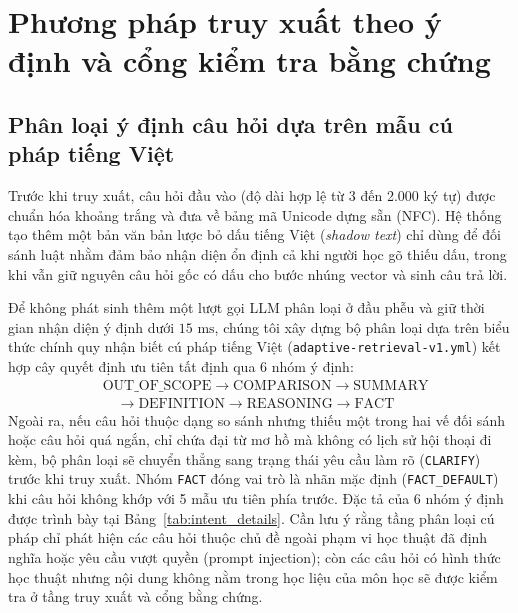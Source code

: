 \documentclass{IEEEtran}
\begin{document}
\section{Phương pháp truy xuất theo ý định và cổng kiểm tra bằng chứng}
\label{sec:adaptive_methodology}

\subsection{Phân loại ý định câu hỏi dựa trên mẫu cú pháp tiếng Việt}
Trước khi truy xuất, câu hỏi đầu vào (độ dài hợp lệ từ 3 đến 2.000 ký tự) được chuẩn hóa khoảng trắng và đưa về bảng mã Unicode dựng sẵn (NFC). Hệ thống tạo thêm một bản văn bản lược bỏ dấu tiếng Việt (\textit{shadow text}) chỉ dùng để đối sánh luật nhằm đảm bảo nhận diện ổn định cả khi người học gõ thiếu dấu, trong khi vẫn giữ nguyên câu hỏi gốc có dấu cho bước nhúng vector và sinh câu trả lời.

Để không phát sinh thêm một lượt gọi LLM phân loại ở đầu phễu và giữ thời gian nhận diện ý định dưới $15\text{~ms}$, chúng tôi xây dựng bộ phân loại dựa trên biểu thức chính quy nhận biết cú pháp tiếng Việt (\texttt{adaptive-retrieval-v1.yml}) kết hợp cây quyết định ưu tiên tất định qua 6 nhóm ý định:
\begin{align*}
&\text{OUT\_OF\_SCOPE} \to \text{COMPARISON} \to \text{SUMMARY} \\
&\quad \to \text{DEFINITION} \to \text{REASONING} \to \text{FACT}
\end{align*}
Ngoài ra, nếu câu hỏi thuộc dạng so sánh nhưng thiếu một trong hai vế đối sánh hoặc câu hỏi quá ngắn, chỉ chứa đại từ mơ hồ mà không có lịch sử hội thoại đi kèm, bộ phân loại sẽ chuyển thẳng sang trạng thái yêu cầu làm rõ (\texttt{CLARIFY}) trước khi truy xuất. Nhóm \texttt{FACT} đóng vai trò là nhãn mặc định (\texttt{FACT\_DEFAULT}) khi câu hỏi không khớp với 5 mẫu ưu tiên phía trước. Đặc tả của 6 nhóm ý định được trình bày tại Bảng~\ref{tab:intent_details}. Cần lưu ý rằng tầng phân loại cú pháp chỉ phát hiện các câu hỏi thuộc chủ đề ngoài phạm vi học thuật đã định nghĩa hoặc yêu cầu vượt quyền (prompt injection); còn các câu hỏi có hình thức học thuật nhưng nội dung không nằm trong học liệu của môn học sẽ được kiểm tra ở tầng truy xuất và cổng bằng chứng.
\end{document}
